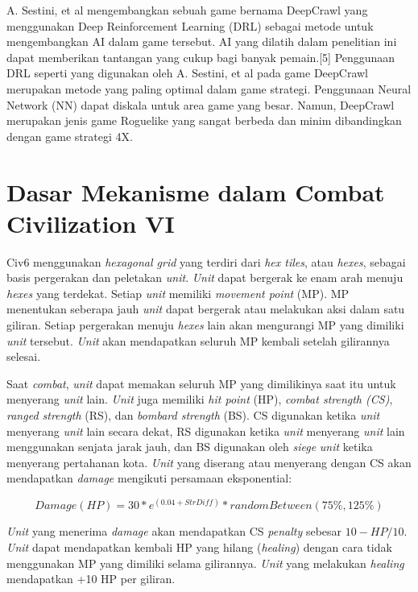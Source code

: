 A. Sestini, et al \citep{deepCrawl} mengembangkan sebuah game bernama DeepCrawl yang menggunakan Deep Reinforcement Learning (DRL) sebagai metode untuk mengembangkan AI dalam game tersebut. AI yang dilatih dalam penelitian ini dapat memberikan tantangan yang cukup bagi banyak pemain.[5] Penggunaan DRL seperti yang digunakan oleh A. Sestini, et al pada game DeepCrawl merupakan metode yang paling optimal dalam game strategi. Penggunaan Neural Network (NN) dapat diskala untuk area game yang besar. Namun, DeepCrawl merupakan jenis game Roguelike yang sangat berbeda dan minim dibandingkan dengan game strategi 4X.

\section{Dasar Mekanisme dalam Combat Civilization VI}
Civ6 menggunakan \emph{hexagonal grid} yang terdiri dari \emph{hex tiles}, atau \emph{hexes}, sebagai basis pergerakan dan peletakan \emph{unit}. 
\emph{Unit} dapat bergerak ke enam arah menuju \emph{hexes} yang terdekat. Setiap \emph{unit} memiliki \emph{movement point} (MP). 
MP menentukan seberapa jauh \emph{unit} dapat bergerak atau melakukan aksi dalam satu giliran. 
Setiap pergerakan menuju \emph{hexes} lain akan mengurangi MP yang dimiliki \emph{unit} tersebut.
\emph{Unit} akan mendapatkan seluruh MP kembali setelah gilirannya selesai.

Saat \emph{combat}, \emph{unit} dapat memakan seluruh MP yang dimilikinya saat itu untuk menyerang \emph{unit} lain.
\emph{Unit} juga memiliki \emph{hit point} (HP), \emph{combat strength (CS)}, \emph{ranged strength} (RS), dan \emph{bombard strength} (BS).
CS digunakan ketika \emph{unit} menyerang \emph{unit} lain secara dekat, RS digunakan ketika \emph{unit} menyerang \emph{unit} lain menggunakan senjata jarak jauh, dan BS digunakan oleh \emph{siege} \emph{unit} ketika menyerang pertahanan kota.
\emph{Unit} yang diserang atau menyerang dengan CS akan mendapatkan \emph{damage} mengikuti persamaan eksponential\citep{civ6Combat}:

\[Damage(HP) = 30 * e^{(0.04+StrDiff)} * randomBetween(75\%, 125\%)\]

\emph{Unit} yang menerima \emph{damage} akan mendapatkan CS \emph{penalty} sebesar \(10 - HP/10\).
\emph{Unit} dapat mendapatkan kembali HP yang hilang (\emph{healing}) dengan cara tidak menggunakan MP yang dimiliki selama gilirannya.
\emph{Unit} yang melakukan \emph{healing} mendapatkan +10 HP per giliran.

